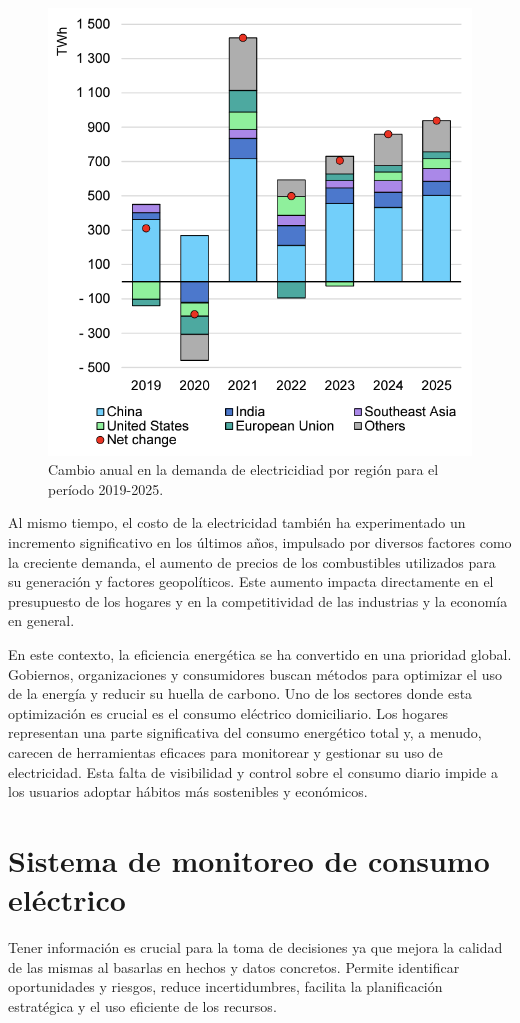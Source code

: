 \begin{figure}[ht]
	\centering
	\includegraphics[width=.6\textwidth]{./Figures/year-on-year-change-in-electricity-demand-by-region-2019-2025.png}
	\caption{Cambio anual en la demanda de electricidiad por región para el período 2019-2025.}
	\label{fig:demandaElectricidad}
\end{figure}


Al mismo tiempo, el costo de la electricidad también ha experimentado un incremento significativo en los últimos años, impulsado por diversos factores como la creciente demanda, el aumento de precios de los combustibles utilizados para su generación y factores geopolíticos. Este aumento impacta directamente en el presupuesto de los hogares y en la competitividad de las industrias y la economía en general.

En este contexto, la eficiencia energética se ha convertido en una prioridad global. Gobiernos, organizaciones y consumidores buscan métodos para optimizar el uso de la energía y reducir su huella de carbono. Uno de los sectores donde esta optimización es crucial es el consumo eléctrico domiciliario. Los hogares representan una parte significativa del consumo energético total y, a menudo, carecen de herramientas eficaces para monitorear y gestionar su uso de electricidad. Esta falta de visibilidad y control sobre el consumo diario impide a los usuarios adoptar hábitos más sostenibles y económicos.

\newpage
\section{Sistema de monitoreo de consumo eléctrico}
Tener información es crucial para la toma de decisiones ya que mejora la calidad de las mismas al basarlas en hechos y datos concretos. Permite identificar oportunidades y riesgos, reduce incertidumbres, facilita la planificación estratégica y el uso eficiente de los recursos.

